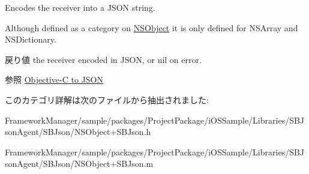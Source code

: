 Encodes the receiver into a J\+S\+O\+N string. 

Although defined as a category on \hyperlink{class_n_s_object-p}{N\+S\+Object} it is only defined for N\+S\+Array and N\+S\+Dictionary.

\begin{DoxyReturn}{戻り値}
the receiver encoded in J\+S\+O\+N, or nil on error.
\end{DoxyReturn}
\begin{DoxySeeAlso}{参照}
\hyperlink{objc2json}{Objective-\/\+C to J\+S\+O\+N} 
\end{DoxySeeAlso}


このカテゴリ詳解は次のファイルから抽出されました\+:\begin{DoxyCompactItemize}
\item 
Framework\+Manager/sample/packages/\+Project\+Package/i\+O\+S\+Sample/\+Libraries/\+S\+B\+Json\+Agent/\+S\+B\+Json/N\+S\+Object+\+S\+B\+Json.\+h\item 
Framework\+Manager/sample/packages/\+Project\+Package/i\+O\+S\+Sample/\+Libraries/\+S\+B\+Json\+Agent/\+S\+B\+Json/N\+S\+Object+\+S\+B\+Json.\+m\end{DoxyCompactItemize}
